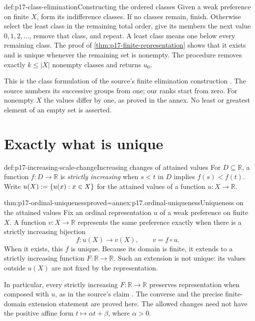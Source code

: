\begin{hbmethod}{def:p17-class-elimination}{Constructing the ordered classes}
Given a weak preference on finite \(X\), form its indifference classes.
If no classes remain, finish. Otherwise select the least class in the
remaining total order, give its members the next value \(0,1,2,\ldots\),
remove that class, and repeat. A least class means one below every
remaining class. The proof of \cref{thm:p17-finite-representation} shows
that it exists and is unique whenever the remaining set is nonempty.
The procedure removes exactly \(k\leq|X|\) nonempty classes and
returns \(u_0\).

This is the class formulation of the source's finite elimination construction
\cite[pp.~13--14]{Rubinstein2015LectureNotes}. The source numbers its
successive groups from one; our ranks start from zero. For nonempty \(X\)
the values differ by one, as proved in the annex. No least or greatest
element of an empty set is asserted.
\end{hbmethod}

\section{Exactly what is unique}
\label{sec:p17-ordinal-uniqueness}

\begin{hbdefinition}{def:p17-increasing-scale-change}{Increasing changes of attained values}
For \(D\subseteq\mathbb{R}\), a function \(f:D\to\mathbb{R}\) is
\emph{strictly increasing} when \(s<t\) in \(D\) implies
\(f(s)<f(t)\). Write
\(u(X)\mathrel{:=}\{u(x):x\in X\}\) for the attained values of a
function \(u:X\to\mathbb{R}\).
\end{hbdefinition}

\begin{hbtheorem}{thm:p17-ordinal-uniqueness}{proved=annex:p17.ordinal-uniqueness}{Uniqueness on the attained values}
Fix an ordinal representation \(u\) of a weak preference on finite
\(X\). A function \(v:X\to\mathbb{R}\) represents the same preference
exactly when there is a strictly increasing bijection
\[
 f:u(X)\longrightarrow v(X),\qquad v=f\circ u.
\]
When it exists, this \(f\) is unique. Because its domain is finite,
it extends to a strictly increasing function \(F:\mathbb{R}\to\mathbb{R}\).
Such an extension is not unique: its values outside \(u(X)\) are
not fixed by the representation.

In particular, every strictly increasing \(F:\mathbb{R}\to\mathbb{R}\) preserves
representation when composed with \(u\), as in the source's claim
\cite[p.~13]{Rubinstein2015LectureNotes}. The converse and the precise
finite-domain extension statement are proved here. The allowed changes
need not have the positive affine form \(t\mapsto\alpha t+\beta\),
where \(\alpha>0\).
\end{hbtheorem}

